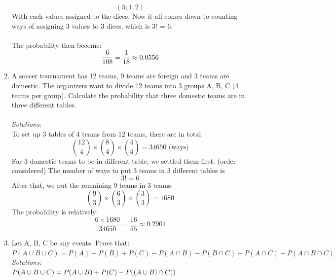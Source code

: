 \documentclass[a4paper]{article}
\begin{document}
\begin{enumerate}
		\begin{equation*}
		    (5;1;2)
		\end{equation*}
		With each values assigned to the dices. Now it all comes down to counting ways of assigning 3 values to 3 dices, which is 3! = 6.\\\\
		The probability then become:
		\begin{equation*}
		    \frac{6}{108} = \frac{1}{18} \approx 0.0556 
		\end{equation*}
		\item A soccer tournament has 12 teams, 9 teams are foreign and 3 teams are domestic. The organizers want to divide 12 teams into 3 groups A, B, C (4 teams per group). Calculate the probability that three domestic teams are in three different tables.\\\\
		\textit{Solutions:} \\
		To set up 3 tables of 4 teams from 12 teams, there are in total
		\begin{equation*}
		{12\choose4}\times{8\choose4}\times{4\choose4} = 34650 \text{ (ways)}
		\end{equation*}
		For 3 domestic teams to be in different table, we settled them first. (order considered) The number of ways to put 3 teams in 3 different tables is
		\begin{equation*}
		    3! = 6
		\end{equation*}
		After that, we put the remaining 9 teams in 3 teams:
		\begin{equation*}
		{9\choose3}\times{6\choose3}\times{3\choose3} = 1680	\end{equation*}
		The probability is relatively: 
		\begin{equation*}
		    \frac{6\times1680}{34650} = \frac{16}{55} \approx 0.2901
		\end{equation*}
		\item Let A, B, C be any events. Prove that: \\
		\begin{math}
		P(A \cup B \cup C) = P(A) + P(B) + P(C) - P(A \cap B) - P(B \cap C) - P(A \cap C) + P(A \cap B \cap C)
		\end{math}\\
		\textit{Solutions:}\\
		\begin{math}
		P(A \cup B \cup C) \newline 
		= P(A \cup B) + P(C) - P((A \cup B)\cap C))
		\newline

\end{math}
\end{enumerate}
\end{document}
